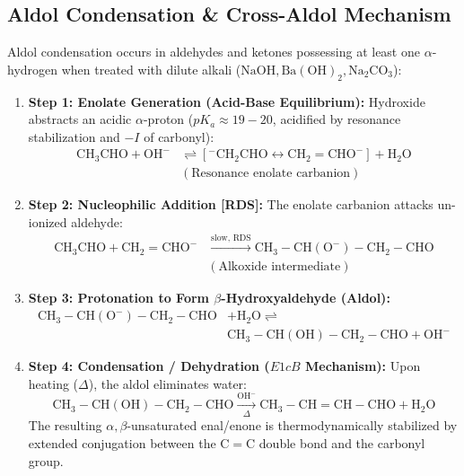 \documentclass[10pt,twoside,openright]{book}
\begin{document}
\subsection{Aldol Condensation \& Cross-Aldol Mechanism}

\begin{conceptbox}
Aldol condensation occurs in aldehydes and ketones possessing at least one $\alpha$-hydrogen when treated with dilute alkali ($\mathrm{NaOH, Ba(OH)_2, Na_2CO_3}$):
\begin{enumerate}[leftmargin=*]
  \item \textbf{Step 1: Enolate Generation (Acid-Base Equilibrium):}
  Hydroxide abstracts an acidic $\alpha$-proton ($pK_a \approx 19-20$, acidified by resonance stabilization and $-I$ of carbonyl):
  \begin{align}
    \mathrm{CH_3CHO} + \mathrm{OH^-} &\rightleftharpoons [\mathrm{^-\!CH_2CHO} \longleftrightarrow \mathrm{CH_2=CHO^-}] + \mathrm{H_2O} \\
    &(\text{Resonance enolate carbanion})
  \end{align}
  \item \textbf{Step 2: Nucleophilic Addition [RDS]:}
  The enolate carbanion attacks un-ionized aldehyde:
  \begin{align}
    \mathrm{CH_3CHO} + \mathrm{CH_2=CHO^-} &\xrightarrow{\text{slow, RDS}} \mathrm{CH_3-CH(O^-)-CH_2-CHO} \\
    &(\text{Alkoxide intermediate})
  \end{align}
  \item \textbf{Step 3: Protonation to Form $\beta$-Hydroxyaldehyde (Aldol):}
  \begin{align}
    \mathrm{CH_3-CH(O^-)-CH_2-CHO} &+ \mathrm{H_2O} \rightleftharpoons \\
    &\mathrm{CH_3-CH(OH)-CH_2-CHO} + \mathrm{OH^-}
  \end{align}
  \item \textbf{Step 4: Condensation / Dehydration ($E1cB$ Mechanism):}
  Upon heating ($\Delta$), the aldol eliminates water:
  \begin{equation}
    \mathrm{CH_3-CH(OH)-CH_2-CHO} \xrightarrow[\Delta]{\mathrm{OH^-}} \mathrm{CH_3-CH=CH-CHO} + \mathrm{H_2O}
  \end{equation}
  The resulting $\alpha,\beta$-unsaturated enal/enone is thermodynamically stabilized by extended conjugation between the $\mathrm{C=C}$ double bond and the carbonyl group.
\end{enumerate}
\end{conceptbox}
\end{document}

